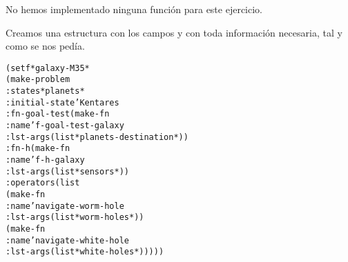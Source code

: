 \begin{aibox}{\function}
No hemos implementado ninguna función para este ejercicio.
\end{aibox}

\begin{aibox}{\examples}
\end{aibox}

\begin{aibox}{\comments}
Creamos una estructura con los campos y con toda información necesaria, tal y como se nos pedía.
\end{aibox}

\begin{aibox}{\pseudocode}
\end{aibox}

\begin{aibox}{\code}
\begin{alltt}
(setf *galaxy-M35*
    (make-problem
        :states *planets*
        :initial-state 'Kentares
        :fn-goal-test (make-fn
                :name 'f-goal-test-galaxy
                :lst-args (list *planets-destination*))
        :fn-h (make-fn
                :name 'f-h-galaxy
                :lst-args (list *sensors*))
        :operators (list
                    (make-fn
                        :name 'navigate-worm-hole 
                        :lst-args (list *worm-holes*))
                    (make-fn
                        :name 'navigate-white-hole
                        :lst-args (list *white-holes*)))))

\end{alltt}
\end{aibox}
